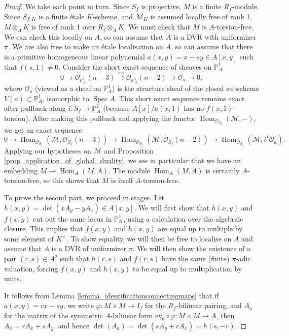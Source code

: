 \documentclass{article} %
\numberwithin{equation}{section}
\DeclareMathOperator{\Hom}{Hom}
\DeclareMathOperator{\Spec}{Spec}
\renewcommand{\P}{\mathbb{P}}
\newcommand{\bbP}{\mathbb{P}}
\newcommand{\cO}{\mathcal{O}}
\newcommand{\cM}{\mathcal{M}}
\begin{document}
\begin{proof}
    We take each point in turn. Since $S_f$ is projective, $M$ is a finite $R_f$-module. Since $S_{f, K}$ is a finite \'etale $K$-scheme, and $\cM_K$ is assumed locally free of rank 1, $M \otimes_A K$ is free of rank 1 over $R_f \otimes_A K$. We must check that $M$ is $A$-torsion-free. We can check this locally on $A$, so can assume that $A$ is a DVR with uniformizer $\pi$. We are also free to make an \'etale localisation on $A$, so can assume that there is a primitive homogeneous linear polynomial $a(x, y) = x - s y \in A[ x, y]$ such that $f(s, 1) \neq 0$. Consider the short exact sequence of sheaves on $\bbP^1_A$
    \[ 0 \to \cO_{\bbP^1_A}(n-3) \overset{\times a}{\to} \cO_{\bbP^1_A}(n-2) \to \cO_a \to 0, \]
    where $\cO_a$ (viewed as a sheaf on $\P^1_A$) is the structure sheaf of the closed subscheme $V(a) \subset \P^1_A$, isomorphic to $\Spec A$. This short exact sequence remains exact after pullback along $i : S_f \to \P^1_A$ (because $A[x] / a(x, 1)$ has no $f(x, 1)$-torsion). After making this pullback and applying the functor $\Hom_{\cO_{S_f}}(\cM, -)$, we get an exact sequence
    \begin{equation}\label{eqn_short_exact_sequence} 0 \to \Hom_{\cO_{S_f}}(\cM, \cO_{S_f}(n-3)) \to \Hom_{\cO_{S_f}}(\cM, \cO_{S_f}(n-2)) \to \Hom_{\cO_{S_f}}(\cM, i^\ast \cO_a). 
    \end{equation}
    Applying
    our hypotheses on $\cM$ and Proposition \ref{prop_application_of_global_duality}, we see in particular that we have an embedding $M \to \Hom_A(M, A)$. The module $\Hom_A(M, A)$ is certainly $A$-torsion-free, so this shows that $M$ is itself $A$-torsion-free. 

    To prove the second part, we proceed in stages. Let $h(x, y) = \det( x A_y - y A_x ) \in A[x, y]$. We will first show that $h(x, y)$ and $f(x, y)$ cut out the same locus in $\bbP^1_K$, using a calculation over the algebraic closure. This implies that $f(x, y)$ and $h(x, y)$ are equal up to multiple by some element of $K^\times$. To show equality, we will then be free to localise on $A$ and assume that $A$ is a DVR of uniformizer $\pi$. We will then show the existence of a pair $(r, s ) \in A^2$ such that $h(r, s)$ and $f(r, s)$ have the same (finite) $\pi$-adic valuation, forcing $f(x, y)$ and $h(x, y)$ to be equal up to multiplication by units. 

    It follows from Lemma \ref{lemma_identificationconnectingmaps} that if $a(x, y) = r x + s y$, we write $\varphi : M \times M \to I_f$ for the $R_f$-bilinear pairing, and $A_a$ for the matrix of the symmetric $A$-bilinear form $\mathrm{ev}_a \circ \varphi : M \times M \to A$, then $A_a = r A_x + s A_y$, and hence $\det(A_a) = \det(s A_y + r A_x) = h(s, -r)$. 


\end{proof}
\end{document}
